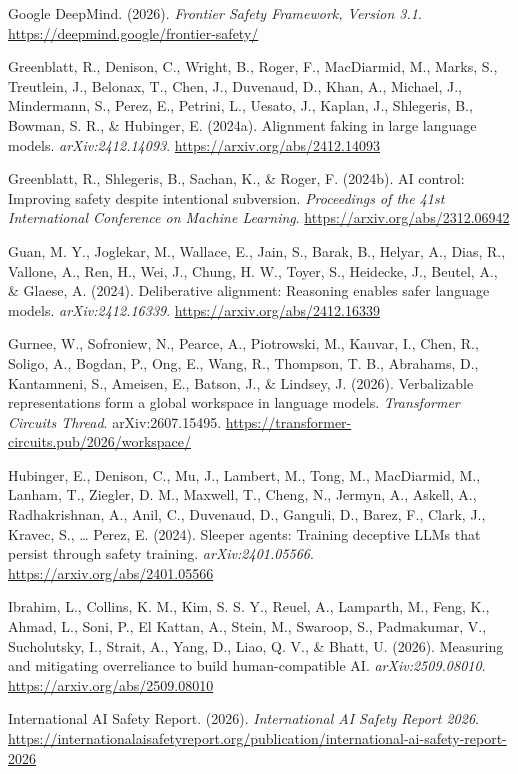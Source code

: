 \documentclass[
  11pt,
]{article}
\begin{document}
Google DeepMind. (2026). \emph{Frontier Safety Framework, Version 3.1}.
\url{https://deepmind.google/frontier-safety/}

Greenblatt, R., Denison, C., Wright, B., Roger, F., MacDiarmid, M.,
Marks, S., Treutlein, J., Belonax, T., Chen, J., Duvenaud, D., Khan, A.,
Michael, J., Mindermann, S., Perez, E., Petrini, L., Uesato, J., Kaplan,
J., Shlegeris, B., Bowman, S. R., \& Hubinger, E. (2024a). Alignment
faking in large language models. \emph{arXiv:2412.14093}.
\url{https://arxiv.org/abs/2412.14093}

Greenblatt, R., Shlegeris, B., Sachan, K., \& Roger, F. (2024b). AI
control: Improving safety despite intentional subversion.
\emph{Proceedings of the 41st International Conference on Machine
Learning}. \url{https://arxiv.org/abs/2312.06942}

Guan, M. Y., Joglekar, M., Wallace, E., Jain, S., Barak, B., Helyar, A.,
Dias, R., Vallone, A., Ren, H., Wei, J., Chung, H. W., Toyer, S.,
Heidecke, J., Beutel, A., \& Glaese, A. (2024). Deliberative alignment:
Reasoning enables safer language models. \emph{arXiv:2412.16339}.
\url{https://arxiv.org/abs/2412.16339}

Gurnee, W., Sofroniew, N., Pearce, A., Piotrowski, M., Kauvar, I., Chen,
R., Soligo, A., Bogdan, P., Ong, E., Wang, R., Thompson, T. B.,
Abrahams, D., Kantamneni, S., Ameisen, E., Batson, J., \& Lindsey, J.
(2026). Verbalizable representations form a global workspace in language
models. \emph{Transformer Circuits Thread}. arXiv:2607.15495.
\url{https://transformer-circuits.pub/2026/workspace/}

Hubinger, E., Denison, C., Mu, J., Lambert, M., Tong, M., MacDiarmid,
M., Lanham, T., Ziegler, D. M., Maxwell, T., Cheng, N., Jermyn, A.,
Askell, A., Radhakrishnan, A., Anil, C., Duvenaud, D., Ganguli, D.,
Barez, F., Clark, J., Kravec, S., \ldots{} Perez, E. (2024). Sleeper
agents: Training deceptive LLMs that persist through safety training.
\emph{arXiv:2401.05566}. \url{https://arxiv.org/abs/2401.05566}

Ibrahim, L., Collins, K. M., Kim, S. S. Y., Reuel, A., Lamparth, M.,
Feng, K., Ahmad, L., Soni, P., El Kattan, A., Stein, M., Swaroop, S.,
Padmakumar, V., Sucholutsky, I., Strait, A., Yang, D., Liao, Q. V., \&
Bhatt, U. (2026). Measuring and mitigating overreliance to build
human-compatible AI. \emph{arXiv:2509.08010}.
\url{https://arxiv.org/abs/2509.08010}

International AI Safety Report. (2026). \emph{International AI Safety
Report 2026}.
\url{https://internationalaisafetyreport.org/publication/international-ai-safety-report-2026}
\end{document}
